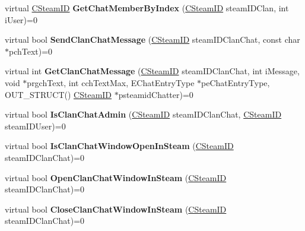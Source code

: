 \begin{DoxyCompactItemize}
\mbox{\label{class_i_steam_friends_a840cbfc191ba1d174b6dfae497b3251b}} 
virtual \hyperlink{class_c_steam_i_d}{C\+Steam\+ID} {\bfseries Get\+Chat\+Member\+By\+Index} (\hyperlink{class_c_steam_i_d}{C\+Steam\+ID} steam\+I\+D\+Clan, int i\+User)=0
\item 
\mbox{\label{class_i_steam_friends_ac66f8ad646a2b5cc58fe90ba8c3ba021}} 
virtual bool {\bfseries Send\+Clan\+Chat\+Message} (\hyperlink{class_c_steam_i_d}{C\+Steam\+ID} steam\+I\+D\+Clan\+Chat, const char $\ast$pch\+Text)=0
\item 
\mbox{\label{class_i_steam_friends_a64a3d35df1e2ede7844e21957b6984cd}} 
virtual int {\bfseries Get\+Clan\+Chat\+Message} (\hyperlink{class_c_steam_i_d}{C\+Steam\+ID} steam\+I\+D\+Clan\+Chat, int i\+Message, void $\ast$prgch\+Text, int cch\+Text\+Max, E\+Chat\+Entry\+Type $\ast$pe\+Chat\+Entry\+Type, O\+U\+T\+\_\+\+S\+T\+R\+U\+CT() \hyperlink{class_c_steam_i_d}{C\+Steam\+ID} $\ast$psteamid\+Chatter)=0
\item 
\mbox{\label{class_i_steam_friends_a6256d1c58f3fd7e1600bf900faf43593}} 
virtual bool {\bfseries Is\+Clan\+Chat\+Admin} (\hyperlink{class_c_steam_i_d}{C\+Steam\+ID} steam\+I\+D\+Clan\+Chat, \hyperlink{class_c_steam_i_d}{C\+Steam\+ID} steam\+I\+D\+User)=0
\item 
\mbox{\label{class_i_steam_friends_a782a7437f023b4b154d40e52679e977c}} 
virtual bool {\bfseries Is\+Clan\+Chat\+Window\+Open\+In\+Steam} (\hyperlink{class_c_steam_i_d}{C\+Steam\+ID} steam\+I\+D\+Clan\+Chat)=0
\item 
\mbox{\label{class_i_steam_friends_ac58ad29248636f3bdeab222a54edb2e5}} 
virtual bool {\bfseries Open\+Clan\+Chat\+Window\+In\+Steam} (\hyperlink{class_c_steam_i_d}{C\+Steam\+ID} steam\+I\+D\+Clan\+Chat)=0
\item 
\mbox{\label{class_i_steam_friends_affe719351751ef5b2bca280986580101}} 
virtual bool {\bfseries Close\+Clan\+Chat\+Window\+In\+Steam} (\hyperlink{class_c_steam_i_d}{C\+Steam\+ID} steam\+I\+D\+Clan\+Chat)=0
\item 
\mbox{\label{class_i_steam_friends_af24d827dae47dfd01349c4810c03c5eb}} 

\end{DoxyCompactItemize}
